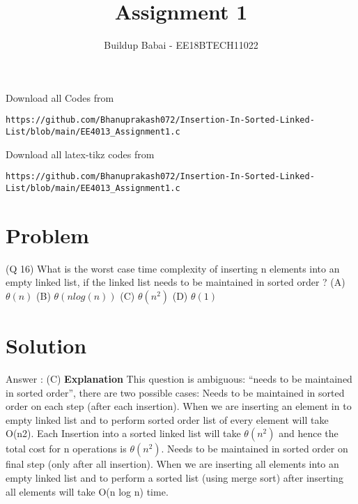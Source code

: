 \documentclass[journal,12pt,twocolumn]{IEEEtran}
\begin{document}
     \def\rightbox#1{\makebox[0in][r]{#1}}
     \def\centbox#1{\makebox[0in]{#1}}
     \def\topbox#1{\raisebox{-\baselineskip}[0in][0in]{#1}}
     \def\midbox#1{\raisebox{-0.5\baselineskip}[0in][0in]{#1}}
\vspace{3cm}
\title{Assignment 1}
\author{Buildup Babai - EE18BTECH11022}
\maketitle
\newpage
\bigskip
\renewcommand{\thefigure}{\theenumi}
\renewcommand{\thetable}{\theenumi}
Download all Codes from 
%
\begin{lstlisting}
https://github.com/Bhanuprakash072/Insertion-In-Sorted-Linked-List/blob/main/EE4013_Assignment1.c
\end{lstlisting}
Download all latex-tikz codes from 
%
\begin{lstlisting}
https://github.com/Bhanuprakash072/Insertion-In-Sorted-Linked-List/blob/main/EE4013_Assignment1.c
\end{lstlisting}
\section{Problem}
(Q 16) What is the worst case time complexity of inserting n elements into an empty linked list, if the linked list needs to be maintained in sorted order ?\newline
(A) $\theta(n)$\newline
(B) $\theta(n log(n))$\newline
(C) $\theta(n^2)$\newline
(D) $\theta(1)$\newline

\section{Solution}
Answer : (C)
\newline
\textbf{Explanation}
This question is ambiguous: “needs to be maintained in sorted order”, there are two possible cases:
\newline
\smallskip \hspace{2ex} Needs to be maintained in sorted order on each step (after each insertion).
When we are inserting an element in to empty linked list and to perform sorted order list of every element will take O(n2).
Each Insertion into a sorted linked list will take $\theta(n^2)$ and hence the total cost for n operations is $\theta(n^2)$.
\newline
\smallskip \hspace{2ex}Needs to be maintained in sorted order on final step (only after all insertion).
When we are inserting all elements into an empty linked list and to perform a sorted list (using merge sort) after inserting all elements will take O(n log n) time.
\end{document}
